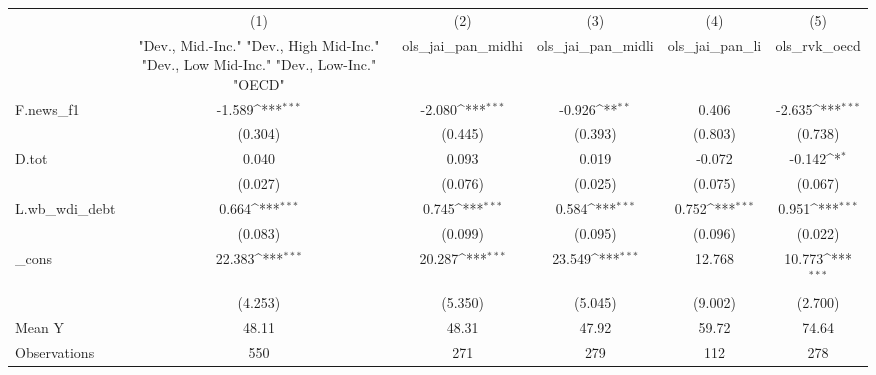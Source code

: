 {
\def\sym#1{\ifmmode^{#1}\else\(^{#1}\)\fi}
\begin{tabular}{l*{5}{c}}
\toprule
            &\multicolumn{1}{c}{(1)}&\multicolumn{1}{c}{(2)}&\multicolumn{1}{c}{(3)}&\multicolumn{1}{c}{(4)}&\multicolumn{1}{c}{(5)}\\
            &\multicolumn{1}{c}{ "Dev., Mid.-Inc." "Dev., High Mid-Inc." "Dev., Low Mid-Inc." "Dev., Low-Inc." "OECD" }&\multicolumn{1}{c}{ols\_jai\_pan\_midhi}&\multicolumn{1}{c}{ols\_jai\_pan\_midli}&\multicolumn{1}{c}{ols\_jai\_pan\_li}&\multicolumn{1}{c}{ols\_rvk\_oecd}\\
\midrule
F.news\_f1   &      -1.589\sym{***}&      -2.080\sym{***}&      -0.926\sym{**} &       0.406         &      -2.635\sym{***}\\
            &     (0.304)         &     (0.445)         &     (0.393)         &     (0.803)         &     (0.738)         \\
\addlinespace
D.tot       &       0.040         &       0.093         &       0.019         &      -0.072         &      -0.142\sym{*}  \\
            &     (0.027)         &     (0.076)         &     (0.025)         &     (0.075)         &     (0.067)         \\
\addlinespace
L.wb\_wdi\_debt&       0.664\sym{***}&       0.745\sym{***}&       0.584\sym{***}&       0.752\sym{***}&       0.951\sym{***}\\
            &     (0.083)         &     (0.099)         &     (0.095)         &     (0.096)         &     (0.022)         \\
\addlinespace
\_cons      &      22.383\sym{***}&      20.287\sym{***}&      23.549\sym{***}&      12.768         &      10.773\sym{***}\\
            &     (4.253)         &     (5.350)         &     (5.045)         &     (9.002)         &     (2.700)         \\
\midrule
Mean Y      &       48.11         &       48.31         &       47.92         &       59.72         &       74.64         \\
Observations&         550         &         271         &         279         &         112         &         278         \\
\bottomrule
\end{tabular}
}
